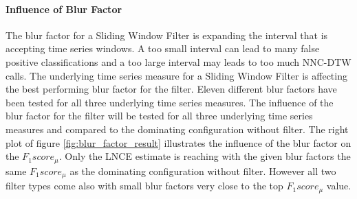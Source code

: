 \paragraph{Influence of Blur Factor} \label{influence_of_blur_factor}
The blur factor for a Sliding Window Filter is expanding the interval that is accepting time series windows. A too small
interval can lead to many false positive classifications and a too large interval may leads to too much NNC-DTW calls.
The underlying time series measure for a Sliding Window Filter is affecting the best performing blur factor for the
filter. Eleven different blur factors have been tested for all three underlying time series measures. The influence of
the blur factor for the filter will be tested for all three underlying time series measures and compared to the
dominating configuration without filter. The right plot of figure \ref{fig:blur_factor_result} illustrates the influence
of the blur factor on the $F_{1}score_{\mu}$. Only the LNCE estimate is reaching with the given blur factors the same
$F_{1}score_{\mu}$ as the dominating configuration without filter. However all two filter types come also with small
blur factors very close to the top $F_{1}score_{\mu}$ value.

